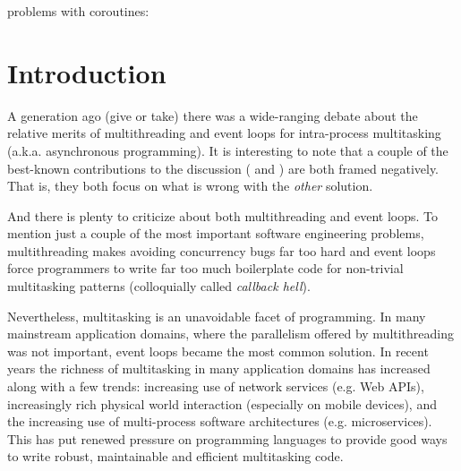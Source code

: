 \documentclass[a4paper,UKenglish,cleveref, autoref]{lipics-v2019}
\begin{document}









problems with coroutines:









\section{Introduction}

A generation ago (give or take) there was a wide-ranging debate about the relative merits of multithreading and event loops for intra-process multitasking (a.k.a. asynchronous programming).
It is interesting to note that a couple of the best-known contributions to the discussion (\cite{Ousterhout1996} and \cite{Behren2003a}) are both framed negatively.
That is, they both focus on what is wrong with the \emph{other} solution.

And there is plenty to criticize about both multithreading and event loops.
To mention just a couple of the most important software engineering problems, multithreading makes avoiding concurrency bugs far too hard \cite{Lu2008} and event loops force programmers to write far too much boilerplate code for non-trivial multitasking patterns \cite{Adya2002} (colloquially called \emph{callback hell}).

Nevertheless, multitasking is an unavoidable facet of programming.
In many mainstream application domains, where the parallelism offered by multithreading was not important, event loops became the most common solution.
In recent years the richness of multitasking in many application domains has increased along with a few trends: increasing use of network services (e.g. Web APIs), increasingly rich physical world interaction (especially on mobile devices), and the increasing use of multi-process software architectures (e.g. microservices).
This has put renewed pressure on programming languages to provide good ways to write robust, maintainable and efficient multitasking code.
\end{document}
